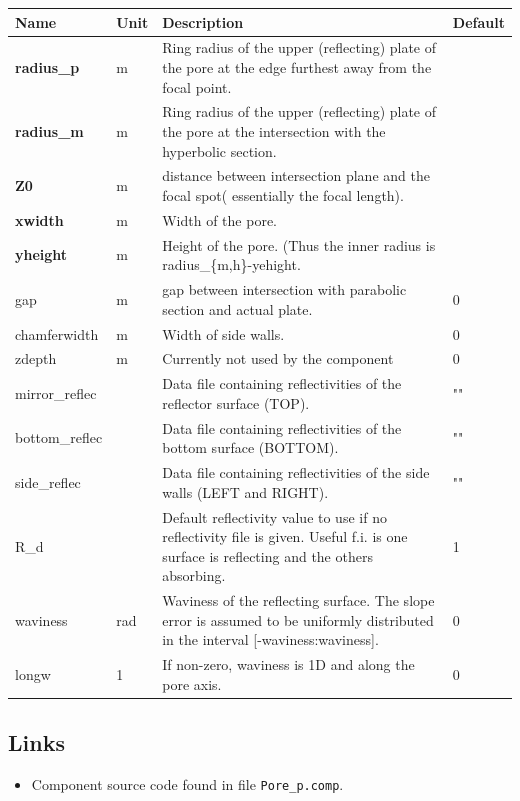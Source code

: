 \begin{longtable}{p{}p{}p{}p{}}
\toprule
\textbf{Name} & \textbf{Unit} & \textbf{Description} & \textbf{Default} \\
\midrule
\endhead
\textbf{radius\_p} & m & Ring radius of the upper (reflecting) plate of the pore at the edge furthest away from the focal point. &  \\
\textbf{radius\_m} & m & Ring radius of the upper (reflecting) plate of the pore at the intersection with the hyperbolic section. &  \\
\textbf{Z0} & m & distance between intersection plane and the focal spot( essentially the focal length). &  \\
\textbf{xwidth} & m & Width of the pore. &  \\
\textbf{yheight} & m & Height of the pore. (Thus the inner radius is radius\_\{m,h\}-yehight. &  \\
gap & m & gap between intersection with parabolic section and actual plate. & 0 \\
chamferwidth & m & Width of side walls. & 0 \\
zdepth & m & Currently not used by the component & 0 \\
mirror\_reflec &   & Data file containing reflectivities of the reflector surface (TOP). & "" \\
bottom\_reflec &   & Data file containing reflectivities of the bottom surface (BOTTOM). & "" \\
side\_reflec &   & Data file containing reflectivities of the side walls (LEFT and RIGHT). & "" \\
R\_d &   & Default reflectivity value to use if no reflectivity file is given. Useful f.i. is one surface is reflecting and the others absorbing. & 1 \\
waviness & rad & Waviness of the reflecting surface. The slope error is assumed to be uniformly distributed in the interval [-waviness:waviness]. & 0 \\
longw & 1 & If non-zero, waviness is 1D and along the pore axis. & 0 \\
\bottomrule
\end{longtable}

\subsection*{Links}
\begin{itemize}
  \item Component source code found in file \texttt{Pore\_p.comp}.
\end{itemize}
